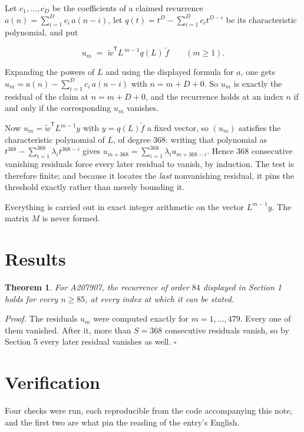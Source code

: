 \documentclass[11pt]{article}
\newtheorem{theorem}{Theorem}
\theoremstyle{definition}
\begin{document}
Let $c_1,\dots,c_D$ be the coefficients of a claimed recurrence $a(n) = \sum_{i=1}^{D} c_i\,a(n-i)$, let $q(t) = t^{D} - \sum_{i=1}^{D} c_i t^{D-i}$ be its characteristic polynomial, and put

\[u_m \;=\; \tilde w^{\mathsf T} L^{\,m-1} q(L)\,\tilde f \qquad (m \ge 1).\]

Expanding the powers of $L$ and using the displayed formula for $a$, one gets $u_m = a(n) - \sum_{i=1}^{D} c_i\,a(n-i)$ with $n = m + D + 0$. So $u_m$ is exactly the residual of the claim at $n = m + D + 0$, and the recurrence holds at an index $n$ if and only if the corresponding $u_m$ vanishes.

Now $u_m = \tilde w^{\mathsf T} L^{m-1} y$ with $y = q(L)\tilde f$ a fixed vector, so $(u_m)$ satisfies the characteristic polynomial of $L$, of degree $368$: writing that polynomial as $t^{368} - \sum_{i=1}^{368} \lambda_i t^{368-i}$ gives $u_{m+368} = \sum_{i=1}^{368} \lambda_i u_{m+368-i}$. Hence $368$ consecutive vanishing residuals force every later residual to vanish, by induction. The test is therefore finite; and because it locates the {\itshape last} nonvanishing residual, it pins the threshold exactly rather than merely bounding it.

Everything is carried out in exact integer arithmetic on the vector $L^{m-1}y$. The matrix $M$ is never formed.

\section{Results}

\begin{theorem} For A207907, the recurrence of order $84$ displayed in Section 1 holds for every $n \ge 85$, at every index at which it can be stated.\end{theorem}

{\itshape Proof.} The residuals $u_m$ were computed exactly for $m = 1,\dots,479$. Every one of them vanished. After it, more than $S = 368$ consecutive residuals vanish, so by Section 5 every later residual vanishes as well. $\square$

\section{Verification}

Four checks were run, each reproducible from the code accompanying this note, and the first two are what pin the reading of the entry's English.
\end{document}
